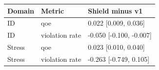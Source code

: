 \begin{tabular}{lll}
\toprule
Domain & Metric & Shield minus v1 \\
\midrule
ID & qoe & 0.022 [0.009, 0.036] \\
ID & violation rate & -0.050 [-0.100, -0.007] \\
Stress & qoe & 0.023 [0.010, 0.040] \\
Stress & violation rate & -0.263 [-0.749, 0.105] \\
\bottomrule
\end{tabular}
